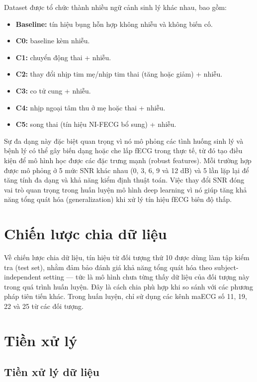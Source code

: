 \documentclass[../DoAn.tex]{subfiles}
\begin{document}
Dataset được tổ chức thành nhiều ngữ cảnh sinh lý khác nhau, bao gồm:
\begin{itemize}
  \item \textbf{Baseline:} tín hiệu bụng hỗn hợp không nhiễu và không biến cố.
  \item \textbf{C0:} baseline kèm nhiễu.
  \item \textbf{C1:} chuyển động thai + nhiễu.
  \item \textbf{C2:} thay đổi nhịp tim mẹ/nhịp tim thai (tăng hoặc giảm) + nhiễu.
  \item \textbf{C3:} co tử cung + nhiễu.
  \item \textbf{C4:} nhịp ngoại tâm thu ở mẹ hoặc thai + nhiễu.
  \item \textbf{C5:} song thai (tín hiệu NI-FECG bổ sung) + nhiễu.
\end{itemize}

Sự đa dạng này đặc biệt quan trọng vì nó mô phỏng các tình huống sinh lý và bệnh lý có thể gây biến dạng hoặc che lấp fECG trong thực tế, từ đó tạo điều kiện để mô hình học được các đặc trưng mạnh (robust features). Mỗi trường hợp được mô phỏng ở 5 mức SNR khác nhau (0, 3, 6, 9 và 12 dB) và 5 lần lặp lại để tăng tính đa dạng và khả năng kiểm định thuật toán. Việc thay đổi SNR đóng vai trò quan trọng trong huấn luyện mô hình deep learning vì nó giúp tăng khả năng tổng quát hóa (generalization) khi xử lý tín hiệu fECG biên độ thấp.

\section{Chiến lược chia dữ liệu}
Về chiến lược chia dữ liệu, tín hiệu từ đối tượng thứ 10 được dùng làm tập kiểm tra (test set), nhằm đảm bảo đánh giá khả năng tổng quát hóa theo subject-independent setting — tức là mô hình chưa từng thấy dữ liệu của đối tượng này trong quá trình huấn luyện. Đây là cách chia phù hợp khi so sánh với các phương pháp tiên tiến khác. Trong huấn luyện, chỉ sử dụng các kênh maECG số 11, 19, 22 và 25 từ các đối tượng.

\section{Tiền xử lý}
\subsection{Tiền xử lý dữ liệu}
\end{document}
